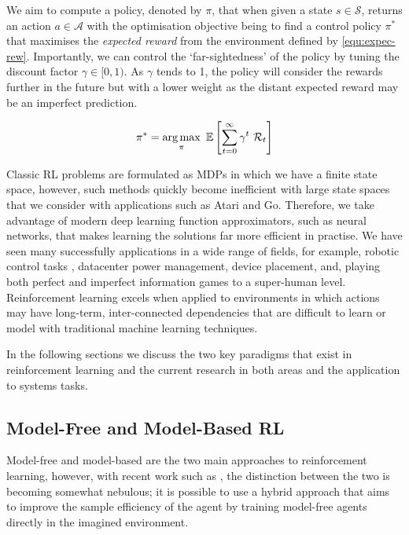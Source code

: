 We aim to compute a policy, denoted by $\pi$, that when given a state $s \in \mathcal{S}$, returns an action $a \in \mathcal{A}$ with the optimisation objective being to find a control policy $\pi^*$ that maximises the \textit{expected reward} from the environment defined by \ref{equ:expec-rew}. Importantly, we can control the `far-sightedness' of the policy by tuning the discount factor $\gamma \in [0, 1)$. As $\gamma$ tends to 1, the policy will consider the rewards further in the future but with a lower weight as the distant expected reward may be an imperfect prediction.

\begin{equation}
  \label{equ:expec-rew}
  \pi^* = \operatorname*{arg\,max}_\pi~\mathbb{E} \left[ \sum^\infty_{t=0} \gamma^t~\mathcal{R}_t \right]
\end{equation}

Classic RL problems are formulated as MDPs in which we have a finite state space, however, such methods quickly become inefficient with large state spaces that we consider with applications such as Atari and Go. Therefore, we take advantage of modern deep learning function approximators, such as neural networks, that makes learning the solutions far more efficient in practise. We have seen many successfully applications in a wide range of fields, for example, robotic control tasks \cite{openai2019solving}, datacenter power management, device placement, and, playing both perfect and imperfect information games to a super-human level. Reinforcement learning excels when applied to environments in which actions may have long-term, inter-connected dependencies that are difficult to learn or model with traditional machine learning techniques.

In the following sections we discuss the two key paradigms that exist in reinforcement learning and the current research in both areas and the application to systems tasks.

\subsection{Model-Free and Model-Based RL}

Model-free and model-based are the two main approaches to reinforcement learning, however, with recent work such as \cite{app10196685, kaiser2020modelbased, robine2021smaller}, the distinction between the two is becoming somewhat nebulous; it is possible to use a hybrid approach that aims to improve the sample efficiency of the agent by training model-free agents directly in the imagined environment.

